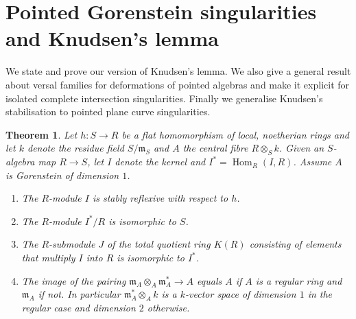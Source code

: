 \documentclass[a4paper,10pt]{amsart}
\theoremstyle{plain}
\newtheorem{thm}[xx]{Theorem}%
\theoremstyle{definition}
\theoremstyle{remark}
\numberwithin{equation}{xx}
\DeclareMathOperator{\Hom}{Hom}
\newcommand{\co}{\colon}
\newcommand{\ra}{\rightarrow}
\newcommand{\ot}{{\otimes}}
\newcommand{\fr}[1]{\mathfrak{{#1}}}
\newcommand{\hm}[4]{{\Hom}_{#2}^{#1}({#3},{#4})}
\begin{document}
\section{Pointed Gorenstein singularities and Knudsen's lemma }
We state and prove our version of Knudsen's lemma. We also give a general result about versal families for deformations of pointed algebras and make it explicit for isolated complete intersection singularities. Finally we generalise Knudsen's stabilisation to pointed plane curve singularities.
\begin{thm}\label{prop.Finn}
Let \(h\co S\ra R\) be a flat homomorphism of local\textup{,} noetherian rings and let \(k\) denote the residue field \(S/\fr{m}_{S}\) and \(A\) the central fibre \(R\ot_{S}k\)\textup{.} Given an \(S\)-algebra map \(R\ra S\)\textup{,} let \(I\) denote the kernel and \(I^{*}=\hm{}{R}{I}{R}\)\textup{.} Assume \(A\) is Gorenstein of dimension \(1\)\textup{.}
\begin{enumerate}
\item[(i)] The \(R\)-module \(I\) is stably reflexive with respect to \(h\)\textup{.}
\item[(ii)] The \(R\)-module \(I^{*}/R\) is isomorphic to \(S\)\textup{.}
\item[(iii)] The \(R\)-submodule \(J\) of the total quotient ring \(K(R)\) consisting of elements that multiply \(I\) into \(R\) is isomorphic to \(I^{*}\)\textup{.}
\item[(iv)] The image of the pairing \(\fr{m}_{A}\ot_{A}\fr{m}_{A}^{*}\ra A\) equals \(A\) if \(A\) is a regular ring and \(\fr{m}_{A}\) if not\textup{.} In particular \(\fr{m}_{A}^{*}\ot_{A}k\) is a \(k\)-vector space of dimension \(1\) in the regular case and dimension \(2\) otherwise\textup{.}
\end{enumerate}
\end{thm}
\end{document}
